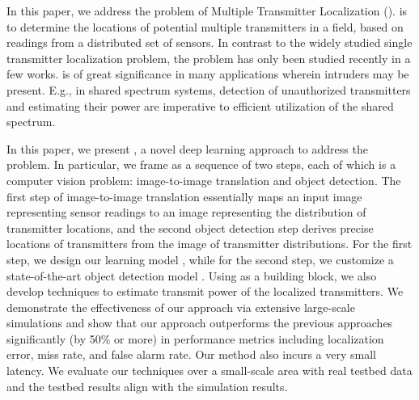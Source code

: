 In this paper, we address the problem of Multiple Transmitter Localization (\mtl).
\mtl is to determine the
locations of potential multiple transmitters in a field, based on readings from a distributed set of sensors.
In contrast to the widely studied single transmitter localization problem, the \mtl problem has only been studied recently in a few works.
\mtl is of great significance in many applications wherein intruders
may be present. E.g., in shared spectrum systems, detection of unauthorized transmitters and estimating their power are imperative to 
efficient utilization of the shared spectrum.
	
In this paper, we present \our, a novel deep learning approach to address the \mtl problem.  
In particular, we frame
\mtl as a sequence of two steps, each of which is a computer vision problem: image-to-image translation and object detection. 
The first step of image-to-image translation essentially maps an input image representing sensor readings to an 
image representing the distribution of transmitter locations, and the second object detection step derives precise
locations of transmitters from the image of transmitter distributions.
For the first step, we design our learning model \imgimg, while for the second step, we customize a 
state-of-the-art object detection model \yolocust. 
Using  \our as a building block, we also develop techniques to estimate transmit power of the localized transmitters.
We demonstrate the effectiveness of our approach
via extensive large-scale simulations and show that our approach outperforms the previous approaches 
significantly (by 50\% or more) in performance metrics including localization error, miss rate, and false alarm rate. 
Our method also incurs a very small latency.
We evaluate our techniques over a small-scale area with real testbed data and the testbed results align with the simulation results.
